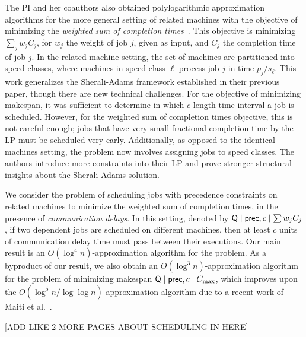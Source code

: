 The PI and her coauthors also obtained polylogarithmic approximation algorithms for the more general setting of
related machines with the objective of minimizing the \emph{weighted sum of completion times}~\cite{DaviesKRTZ21}.
This objective is minimizing $\sum_j w_j C_j$, for $w_j$ the weight of job $j$, given as input, and
$C_j$ the completion time of job $j$.
In the related machine setting, the set of machines are partitioned into speed classes, where machines in speed class $\ell$
process job $j$ in time $p_j / s_\ell$.
This work generalizes the Sherali-Adams framework established in their previous paper, though there are new technical challenges.
For the objective of minimizing makespan, it was sufficient to determine in which $c$-length time interval a job is scheduled. 
However, for the weighted sum of completion times objective, this is not careful enough; jobs that have very small fractional completion time by the LP 
must be scheduled very early.
Additionally, as opposed to the identical machines setting, the problem now involves assigning jobs to speed classes.
The authors introduce more constraints into their LP and prove stronger structural insights about the Sherali-Adams solution.

We consider the problem of scheduling jobs with precedence constraints on related machines
to minimize the weighted sum of completion times,
in the presence of {\em communication delays}.
In this setting,
denoted by $\mathsf{Q} \mid \mathsf{prec}, c \mid \sum w_jC_j$,
if two dependent jobs are scheduled on different machines,
then at least $c$ units of communication delay time must pass between their executions.
Our main result is an $O(\log^4 n)$-approximation algorithm for the problem.
As a byproduct of our result, we also obtain an $O(\log^3 n)$-approximation algorithm for the problem of minimizing makespan  $\mathsf{Q} \mid \mathsf{prec}, c \mid C_{\textrm{max}}$, which improves upon the $O(\log^5 n/\log \log n)$-approximation algorithm due to a recent work of  Maiti et al.~\cite{MRSSV}.



[ADD LIKE 2 MORE PAGES ABOUT SCHEDULING IN HERE]